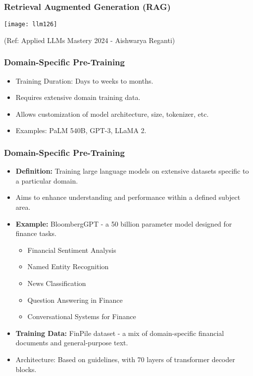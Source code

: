 \begin{frame}[fragile]\frametitle{Retrieval Augmented Generation (RAG)}

\begin{center}
\texttt{[image: llm126]}
\end{center}				

{\tiny (Ref: Applied LLMs Mastery 2024 - Aishwarya Reganti)}

\end{frame}




\begin{frame}[fragile]\frametitle{Domain-Specific Pre-Training}

      \begin{itemize}
        \item Training Duration: Days to weeks to months.
        \item Requires extensive domain training data.
        \item Allows customization of model architecture, size, tokenizer, etc.
        \item Examples: PaLM 540B, GPT-3, LLaMA 2.
      \end{itemize}

\end{frame}


\begin{frame}[fragile]\frametitle{Domain-Specific Pre-Training}
  \begin{itemize}
    \item \textbf{Definition:} Training large language models on extensive datasets specific to a particular domain.
    \item Aims to enhance understanding and performance within a defined subject area.
    \item \textbf{Example:} BloombergGPT - a 50 billion parameter model designed for finance tasks.
      \begin{itemize}
        \item Financial Sentiment Analysis
        \item Named Entity Recognition
        \item News Classification
        \item Question Answering in Finance
        \item Conversational Systems for Finance
      \end{itemize}
    \item \textbf{Training Data:} FinPile dataset - a mix of domain-specific financial documents and general-purpose text.
    \item Architecture: Based on guidelines, with 70 layers of transformer decoder blocks.
  \end{itemize}
\end{frame}

